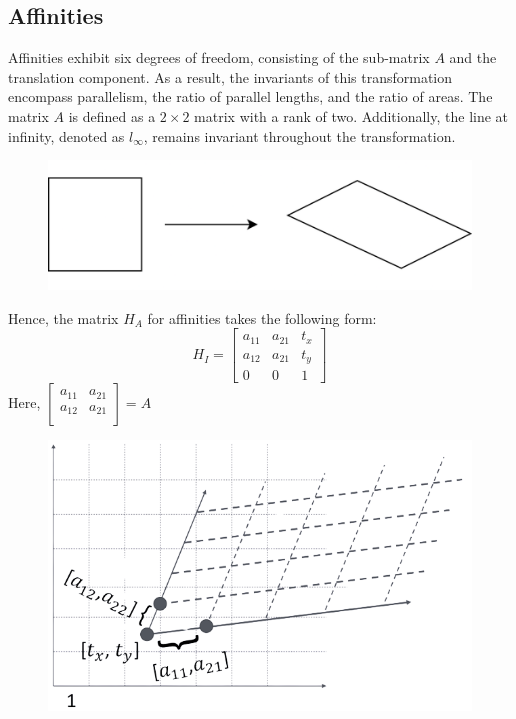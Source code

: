 \subsection{Affinities}
Affinities exhibit six degrees of freedom, consisting of the sub-matrix $A$ and the translation component. 
As a result, the invariants of this transformation encompass parallelism, the ratio of parallel lengths, and the ratio of areas. 
The matrix $A$ is defined as a $2 \times 2$ matrix with a rank of two. 
Additionally, the line at infinity, denoted as $l_{\infty}$, remains invariant throughout the transformation.
\begin{figure}[H]
    \centering
    \includegraphics[width=0.25\linewidth]{images/affinities.png}
\end{figure}
Hence, the matrix $H_A$ for affinities takes the following form:
\[H_I=
\begin{bmatrix}
    a_{11} & a_{21} & t_x \\
    a_{12} & a_{21} & t_y \\
    0 & 0 & 1
\end{bmatrix}\]
Here, $
\begin{bmatrix}
    a_{11} & a_{21} \\
    a_{12} & a_{21} \\
\end{bmatrix}
=A$
\begin{figure}[H]
    \centering
    \includegraphics[width=0.3\linewidth]{images/affinities1.png}
\end{figure}

